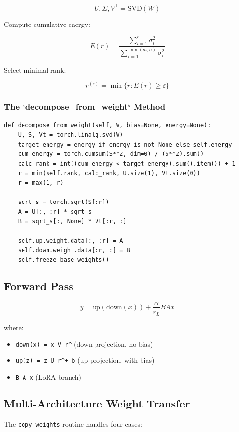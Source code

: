 \[
U, \Sigma, V^\top = \text{SVD}(W)
\tag{4.1}
\]

Compute cumulative energy:

\[
E(r) = \frac{\sum_{i=1}^r \sigma_i^2}{\sum_{i=1}^{\min(m,n)} \sigma_i^2}
\tag{4.2}
\]

Select minimal rank:

\[
r^{(\varepsilon)} = \min\{r : E(r) \geq \varepsilon\}
\tag{4.3}
\]

\subsubsection{The `decompose\_from\_weight` Method}

\begin{lstlisting}
def decompose_from_weight(self, W, bias=None, energy=None):
    U, S, Vt = torch.linalg.svd(W)
    target_energy = energy if energy is not None else self.energy
    cum_energy = torch.cumsum(S**2, dim=0) / (S**2).sum()
    calc_rank = int((cum_energy < target_energy).sum().item()) + 1
    r = min(self.rank, calc_rank, U.size(1), Vt.size(0))
    r = max(1, r)
    
    sqrt_s = torch.sqrt(S[:r])
    A = U[:, :r] * sqrt_s
    B = sqrt_s[:, None] * Vt[:r, :]
    
    self.up.weight.data[:, :r] = A
    self.down.weight.data[:r, :] = B
    self.freeze_base_weights()
\end{lstlisting}

\subsection{Forward Pass}

\[
y = \text{up}(\text{down}(x)) + \frac{\alpha}{r_L} B A x
\tag{4.4}
\]

where:
\begin{itemize}
\item \texttt{down(x) = x V\_r\^{}\top} (down-projection, no bias)
\item \texttt{up(z) = z U\_r\^{}\top + b} (up-projection, with bias)
\item \texttt{B A x} (LoRA branch)

\end{itemize}
\subsection{Multi-Architecture Weight Transfer}

The \texttt{copy\_weights} routine handles four cases:

